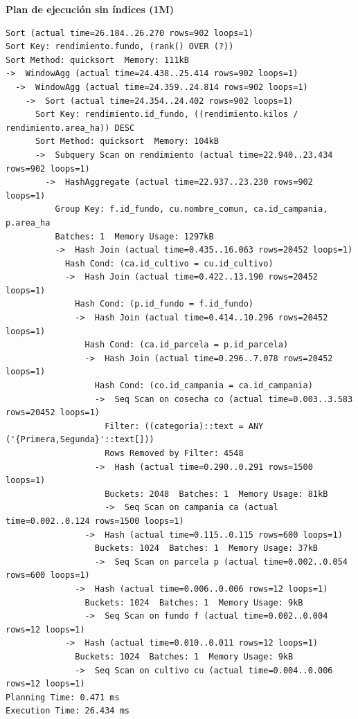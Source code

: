 \documentclass[11pt,letterpaper]{article}
\begin{document}
\textbf{Plan de ejecución sin índices (1M)}
\begin{lstlisting}[style=plano]
Sort (actual time=26.184..26.270 rows=902 loops=1)
Sort Key: rendimiento.fundo, (rank() OVER (?))
Sort Method: quicksort  Memory: 111kB
->  WindowAgg (actual time=24.438..25.414 rows=902 loops=1)
  ->  WindowAgg (actual time=24.359..24.814 rows=902 loops=1)
    ->  Sort (actual time=24.354..24.402 rows=902 loops=1)
      Sort Key: rendimiento.id_fundo, ((rendimiento.kilos / rendimiento.area_ha)) DESC
      Sort Method: quicksort  Memory: 104kB
      ->  Subquery Scan on rendimiento (actual time=22.940..23.434 rows=902 loops=1)
        ->  HashAggregate (actual time=22.937..23.230 rows=902 loops=1)
          Group Key: f.id_fundo, cu.nombre_comun, ca.id_campania, p.area_ha
          Batches: 1  Memory Usage: 1297kB
          ->  Hash Join (actual time=0.435..16.063 rows=20452 loops=1)
            Hash Cond: (ca.id_cultivo = cu.id_cultivo)
            ->  Hash Join (actual time=0.422..13.190 rows=20452 loops=1)
              Hash Cond: (p.id_fundo = f.id_fundo)
              ->  Hash Join (actual time=0.414..10.296 rows=20452 loops=1)
                Hash Cond: (ca.id_parcela = p.id_parcela)
                ->  Hash Join (actual time=0.296..7.078 rows=20452 loops=1)
                  Hash Cond: (co.id_campania = ca.id_campania)
                  ->  Seq Scan on cosecha co (actual time=0.003..3.583 rows=20452 loops=1)
                    Filter: ((categoria)::text = ANY ('{Primera,Segunda}'::text[]))
                    Rows Removed by Filter: 4548
                  ->  Hash (actual time=0.290..0.291 rows=1500 loops=1)
                    Buckets: 2048  Batches: 1  Memory Usage: 81kB
                    ->  Seq Scan on campania ca (actual time=0.002..0.124 rows=1500 loops=1)
                ->  Hash (actual time=0.115..0.115 rows=600 loops=1)
                  Buckets: 1024  Batches: 1  Memory Usage: 37kB
                  ->  Seq Scan on parcela p (actual time=0.002..0.054 rows=600 loops=1)
              ->  Hash (actual time=0.006..0.006 rows=12 loops=1)
                Buckets: 1024  Batches: 1  Memory Usage: 9kB
                ->  Seq Scan on fundo f (actual time=0.002..0.004 rows=12 loops=1)
            ->  Hash (actual time=0.010..0.011 rows=12 loops=1)
              Buckets: 1024  Batches: 1  Memory Usage: 9kB
              ->  Seq Scan on cultivo cu (actual time=0.004..0.006 rows=12 loops=1)
Planning Time: 0.471 ms
Execution Time: 26.434 ms
\end{lstlisting}
\end{document}
